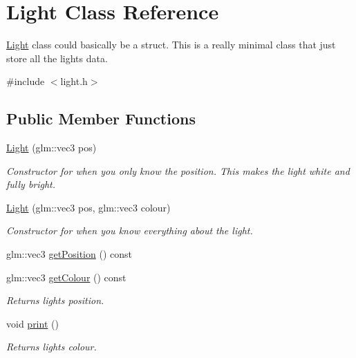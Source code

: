 \hypertarget{class_light}{}\section{Light Class Reference}
\label{class_light}


\mbox{\hyperlink{class_light}{Light}} class could basically be a struct. This is a really minimal class that just store all the light\textquotesingle{}s data.  




{\ttfamily \#include $<$light.\+h$>$}

\subsection*{Public Member Functions}
\begin{DoxyCompactItemize}
\item 
\mbox{\hyperlink{class_light_a62bbd4eb90c31a7e07a3153b7ce5d1d4}{Light}} (glm\+::vec3 pos)
\begin{DoxyCompactList}\small\item\em Constructor for when you only know the position. This makes the light white and fully bright. \end{DoxyCompactList}\item 
\mbox{\hyperlink{class_light_ab2624427110cf6d5d905159d70c827b6}{Light}} (glm\+::vec3 pos, glm\+::vec3 colour)
\begin{DoxyCompactList}\small\item\em Constructor for when you know everything about the light. \end{DoxyCompactList}\item 
glm\+::vec3 \mbox{\hyperlink{class_light_a24d3c226daf99f57427a0cb4b75605a7}{get\+Position}} () const
\item 
glm\+::vec3 \mbox{\hyperlink{class_light_ad00d8f1eba15a5d25b034f64e5bb4c43}{get\+Colour}} () const
\begin{DoxyCompactList}\small\item\em Returns light\textquotesingle{}s position. \end{DoxyCompactList}\item 
void \mbox{\hyperlink{class_light_a99d3d45283ee007ffc8b19c0d7d27077}{print}} ()
\begin{DoxyCompactList}\small\item\em Returns light\textquotesingle{}s colour. \end{DoxyCompactList}\end{DoxyCompactItemize}


